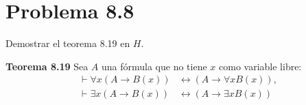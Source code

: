 \documentclass[letterpaper,12pt]{memoir}
\theoremstyle{definition}
\begin{document}
\section*{Problema 8.8}

Demostrar el teorema 8.19 en \(H\).\\
\newline

\textbf{Teorema 8.19} Sea \(A\) una fórmula que no tiene \(x\) como variable libre:
\begin{align}
  \vdash \forall x(A \rightarrow B(x)) & \leftrightarrow (A \rightarrow \forall xB(x)),\\
  \vdash \exists x(A \rightarrow B(x)) & \leftrightarrow  (A \rightarrow \exists xB(x))
\end{align}
\end{document}
